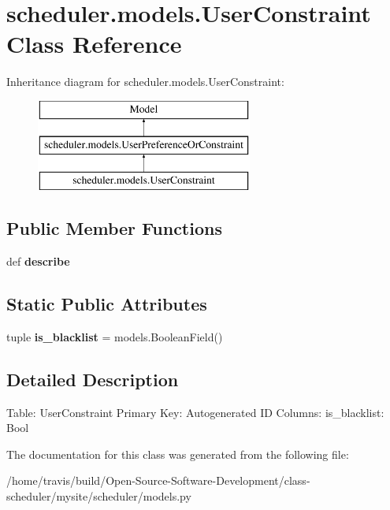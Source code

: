 \hypertarget{classscheduler_1_1models_1_1_user_constraint}{\section{scheduler.\-models.\-User\-Constraint Class Reference}
\label{classscheduler_1_1models_1_1_user_constraint}
}
Inheritance diagram for scheduler.\-models.\-User\-Constraint\-:\begin{figure}[H]
\begin{center}
\leavevmode
\includegraphics[height=3.000000cm]{classscheduler_1_1models_1_1_user_constraint}
\end{center}
\end{figure}
\subsection*{Public Member Functions}
\begin{DoxyCompactItemize}
\item 
\hypertarget{classscheduler_1_1models_1_1_user_constraint_a69ca598611d4eb869e25db7dd9cd3659}{def {\bfseries describe}}\label{classscheduler_1_1models_1_1_user_constraint_a69ca598611d4eb869e25db7dd9cd3659}

\end{DoxyCompactItemize}
\subsection*{Static Public Attributes}
\begin{DoxyCompactItemize}
\item 
\hypertarget{classscheduler_1_1models_1_1_user_constraint_a120a4f7219a677bc9940a486ec0fff4f}{tuple {\bfseries is\-\_\-blacklist} = models.\-Boolean\-Field()}\label{classscheduler_1_1models_1_1_user_constraint_a120a4f7219a677bc9940a486ec0fff4f}

\end{DoxyCompactItemize}


\subsection{Detailed Description}
\begin{DoxyVerb}    Table: UserConstraint
    Primary Key: Autogenerated ID
    Columns:
        is_blacklist: Bool
\end{DoxyVerb}
 

The documentation for this class was generated from the following file\-:\begin{DoxyCompactItemize}
\item 
/home/travis/build/\-Open-\/\-Source-\/\-Software-\/\-Development/class-\/scheduler/mysite/scheduler/models.\-py\end{DoxyCompactItemize}
